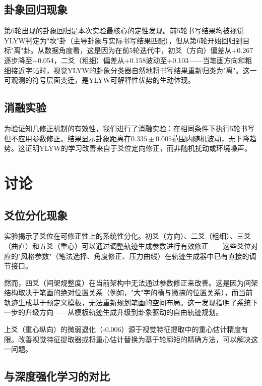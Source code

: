 \documentclass[12pt,a4paper]{article}
\begin{document}
\subsection{卦象回归现象}

第6轮出现的卦象回归是本次实验最核心的定性发现。前5轮书写结果均被视觉YLYW判定为"坎"卦（主导卦象与实际书写结果匹配），但从第6轮开始回归到目标"离"卦。从数据角度看，这是因为在前5轮迭代中，初爻（方向）偏差从+0.267逐步降至+0.054，二爻（粗细）偏差从+0.158波动至+0.103——当笔画方向和粗细接近字帖时，视觉YLYW的卦象分类器自然地将书写结果重新归类为"离"。这一可观测的符号层面变迁，是YLYW可解释性优势的生动体现。

\subsection{消融实验}

为验证知几修正机制的有效性，我们进行了消融实验：在相同条件下执行5轮书写但不应用参数修正。结果显示卦象距离在$0.335\pm0.005$范围内随机波动，无下降趋势。这证明YLYW的学习改善来自于爻位定向修正，而非随机扰动或环境噪声。

\section{讨论}

\subsection{爻位分化现象}

实验揭示了爻位在可修正性上的系统性分化。初爻（方向）、二爻（粗细）、三爻（曲直）和五爻（重心）可以通过调整轨迹生成参数进行有效修正——这些爻位对应的"风格参数"（笔法选择、角度修正、压力曲线）在轨迹生成器中已有直接的调节接口。

然而，四爻（间架规整度）在当前架构中无法通过参数修正来改善。这是因为间架结构取决于笔画的绝对位置关系（例如，"大"字的横与撇捺的位置关系），而当前轨迹生成基于预定义模板，无法重新规划笔画的空间布局。这一发现指明了系统下一步的升级方向——从模板轨迹生成升级到卦象驱动的自由轨迹规划。

上爻（重心纵向）的微弱退化（-0.006）源于视觉特征提取中的重心估计精度有限。改善视觉特征提取器或将重心估计替换为基于轮廓矩的精确方法，可以解决这一问题。

\subsection{与深度强化学习的对比}
\end{document}

